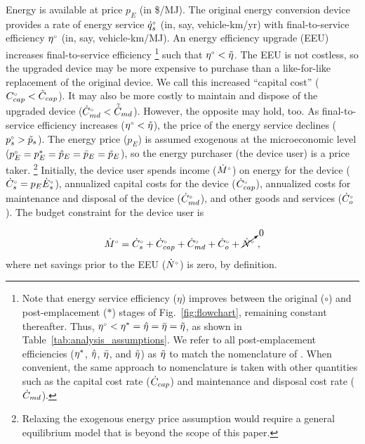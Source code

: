 \documentclass[12pt]{article}\usepackage[]{graphicx}\usepackage[]{xcolor}
\begin{document}
Energy is available at price $p_E$ (in \$/MJ).
The original energy conversion device provides a rate of energy service 
${}{\dot{q}}^{\scriptscriptstyle \circ}_s$ (in, say, vehicle-km/yr)
with final-to-service efficiency ${}{\eta}^{\scriptscriptstyle \circ}$ (in, say, vehicle-km/MJ).
An energy efficiency upgrade (EEU) increases
final-to-service efficiency%
\footnote{
  Note that energy service efficiency ($\eta$) improves
  between the original ($\circ$) and
  post-emplacement ($*$)
  stages of Fig.~\ref{fig:flowchart}, remaining constant thereafter.
  Thus, ${}{\eta}^{\scriptscriptstyle \circ} < {\eta}^* = \hat{\eta} = \bar{\eta} = \tilde{\eta}$,
  as shown in Table~\ref{tab:analysis_assumptions}.
  We refer to all post-emplacement efficiencies 
  (${\eta}^*$, $\hat{\eta}$, $\bar{\eta}$, and $\tilde{\eta}$)
  as $\tilde{\eta}$
  to match the nomenclature of \citet{Borenstein:2015aa}.
  When convenient, the same approach to nomenclature is taken with other quantities such as 
  the capital cost rate ($\dot{C}_{cap}$) and 
  maintenance and disposal cost rate ($\dot{C}_{md}$).
}
such that
${}{\eta}^{\scriptscriptstyle \circ} < \tilde{\eta}$.
The EEU is not costless, so
the upgraded device may be more expensive to purchase
than a like-for-like replacement of the original device.
We call this increased ``capital cost'' 
(${}{C}^{\scriptscriptstyle \circ}_{cap} < \tilde{C}_{cap}$). 
It may also 
be more costly to maintain and dispose of the upgraded device
(${}{\dot{C}}^{\scriptscriptstyle \circ}_{md} < \tilde{\dot{C}}_{md}$). 
However, the opposite may hold, too.
As final-to-service efficiency increases (${}{\eta}^{\scriptscriptstyle \circ} < \tilde{\eta}$),
the price of the energy service declines (${}{p}^{\scriptscriptstyle \circ}_s > \tilde{p}_s$).
The energy price ($p_E$) is assumed exogenous
at the microeconomic level
(${}{p}^{\scriptscriptstyle \circ}_E = {p}^*_E = \hat{p}_E = \bar{p}_E  = \tilde{p}_E$),
so the energy purchaser (the device user) is a price taker.%
\footnote{
  Relaxing the exogenous energy price assumption
  would require a general equilibrium model that is beyond the scope of this paper.
}
%
Initially, the device user spends income (${}{\dot{M}}^{\scriptscriptstyle \circ}$)
on energy for the device (${}{\dot{C}}^{\scriptscriptstyle \circ}_s = p_E {}{\dot{E}}^{\scriptscriptstyle \circ}_s$), 
annualized capital costs for the device (${}{\dot{C}}^{\scriptscriptstyle \circ}_{cap}$), 
annualized costs for maintenance and disposal of the device (${}{\dot{C}}^{\scriptscriptstyle \circ}_{md}$), and 
other goods and services (${}{\dot{C}}^{\scriptscriptstyle \circ}_o$).
The budget constraint
for the device user is

\begin{equation} \label{eq:budget_constraint}
  {}{\dot{M}}^{\scriptscriptstyle \circ} = {}{\dot{C}}^{\scriptscriptstyle \circ}_s + {}{\dot{C}}^{\scriptscriptstyle \circ}_{cap} + {}{\dot{C}}^{\scriptscriptstyle \circ}_{md} + {}{\dot{C}}^{\scriptscriptstyle \circ}_{o} + \cancelto{0}{{}{\dot{N}}^{\scriptscriptstyle \circ}} \; ,
\end{equation}
%
where 
net savings prior to the EEU (${}{\dot{N}}^{\scriptscriptstyle \circ}$) is zero, by definition.
\end{document}
